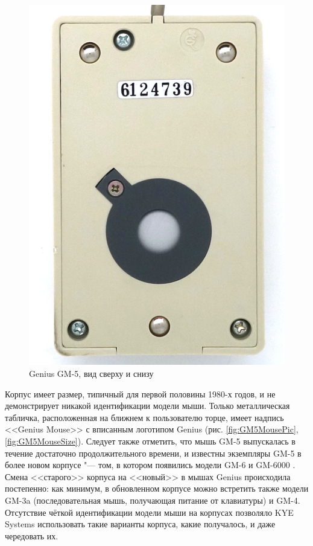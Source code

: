 \documentclass[11pt, a4paper]{article}
\begin{document}
\begin{figure}[h]
    \includegraphics[scale=0.75]{1987_genius_gm5_mouse/bottom_30.jpg}
    \caption{Genius GM-5, вид сверху и снизу}
    \label{fig:GM5MouseTopAndBottom}
\end{figure}

Корпус имеет размер, типичный для первой половины 1980-х годов, и не демонстрирует никакой идентификации модели мыши. Только металлическая табличка, расположенная на ближнем к пользователю торце, имеет надпись <<Genius Mouse>> с вписанным логотипом Genius (рис. \ref{fig:GM5MousePic}, \ref{fig:GM5MouseSize}). Следует также отметить, что мышь GM-5 выпускалась в течение достаточно продолжительного времени, и известны экземпляры GM-5 в более новом корпусе "--- том, в котором появились модели  GM-6 и GM-6000 \cite{commodore}. Смена <<старого>> корпуса на <<новый>> в мышах Genius происходила постепенно: как минимум, в обновленном корпусе можно встретить также модели GM-3a (последовательная мышь, получающая питание от клавиатуры) и GM-4. Отсутствие чёткой идентификации модели мыши на корпусах позволяло KYE Systems использовать такие варианты корпуса, какие получалось, и даже чередовать их.
\end{document}
